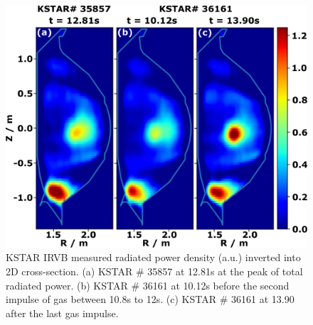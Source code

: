 \begin{figure}[!h]
 \centering
 \includegraphics[width=\linewidth]{figures/Prad_2D.pdf}
 \caption{
KSTAR \ac{IRVB} measured radiated power density (a.u.) inverted into 2D cross-section.
(a) KSTAR \# 35857 at 12.81s at the peak of total radiated power.
(b) KSTAR \# 36161 at 10.12s before  the second impulse of gas between 10.8s to 12s.
(c) KSTAR \# 36161 at 13.90 after the last gas impulse.
}
\label{fig:prad_2d}
\end{figure}
